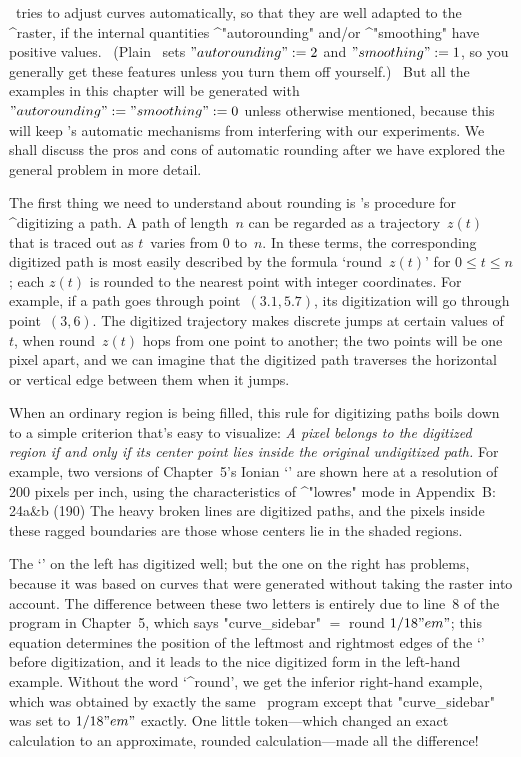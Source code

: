 \danger \MF\ tries to adjust curves automatically, so that they are
well adapted to the ^{raster}, if the internal quantities ^"autorounding"
and/or ^"smoothing" have positive values. \ (Plain \MF\ sets
$"autorounding":=2$ and $"smoothing":=1$, so you generally get these
features unless you turn them off yourself.) \ But all the examples in
this chapter will be generated with $"autorounding":="smoothing":=0$
unless otherwise mentioned, because this will keep \MF's automatic
mechanisms from interfering with our experiments. We shall discuss the
pros and cons of automatic rounding after we have explored the general
problem in more detail.

\danger The first thing we need to understand about rounding is \MF's
procedure for ^{digitizing} a path. A path of length~$n$ can be regarded
as a trajectory~$z(t)$ that is traced out as $t$~varies from 0 to~$n$.  In
these terms, the corresponding digitized path is most easily described by
the formula `round~$z(t)$' for $0\le t\le n$; each $z(t)$ is rounded to
the nearest point with integer coordinates.  For example, if a path goes
through point~$(3.1,5.7)$, its digitization will go through point~$(3,6)$.
The digitized trajectory makes discrete jumps at certain values of $t$,
when round~$z(t)$ hops from one point to another; the two points will be
one pixel apart, and we can imagine that the digitized path traverses the
horizontal or vertical edge between them when it jumps.

\danger When an ordinary region is being filled, this rule for
digitizing paths boils down to a simple criterion that's easy to
visualize: {\sl A pixel belongs to the digitized region if and only if
its center point lies inside the original undigitized path.} For example,
two versions of Chapter~5's Ionian `{\manual\IOO}' are shown here
at a resolution of 200 pixels per inch, using the characteristics
of ^"lowres" mode in Appendix~B:
\displayfig 24a\&b (190\apspix)
The heavy broken lines are digitized paths, and the pixels inside these
ragged boundaries are those whose centers lie in the shaded regions.

\danger The `{\manual\IOO}' on the left has digitized well; but the
one on the right has problems, because it was based on curves that
were generated without taking the raster into account. The difference
between these two letters is entirely due to line~8 of the program
in Chapter~5, which says
\begindisplay
"curve\_sidebar" $=$ round $1/18"em"$;
\enddisplay
this equation determines the position of the leftmost and rightmost
edges of the `{\manual\IOO}' before digitization, and it leads to
the nice digitized form in the left-hand example. Without the word
`^{round}', we get the inferior right-hand example, which was
obtained by exactly the same \MF\ program except that "curve\_sidebar"
was set to $1/18"em"$ exactly. One little token---which changed an exact
calculation to an approximate, rounded calculation---made all the difference!

